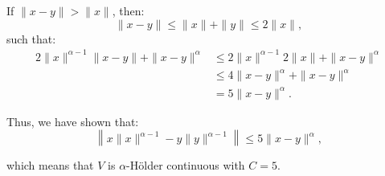 If \(\|x-y\| > \|x\|\), then:
\begin{equation*}
    \|x-y\| \leq \|x\| + \|y\| \leq 2\|x\|,
\end{equation*}
such that:
\begin{equation*}
    \begin{aligned}
        2 \|x\|^{\alpha - 1} \|x - y\| + \|x - y\|^\alpha 
        &\leq 2 \|x\|^{\alpha - 1} 2\|x\| + \|x - y\|^\alpha \\
        &\leq 4 \|x - y\|^{\alpha} + \|x - y\|^\alpha \\
        &= 5 \|x - y\|^{\alpha}.
    \end{aligned}
\end{equation*}

Thus, we have shown that:
\begin{equation*}
    \left\| x \|x\|^{\alpha - 1} - y \|y\|^{\alpha - 1} \right\| \leq 5 \|x - y\|^{\alpha},
\end{equation*}

which means that \( V \) is \( \alpha \)-Hölder continuous with \( C = 5 \).